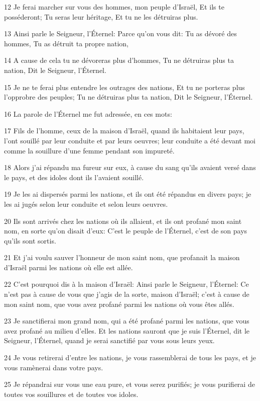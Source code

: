 \par 12 Je ferai marcher sur vous des hommes, mon peuple d'Israël, Et ils te posséderont; Tu seras leur héritage, Et tu ne les détruiras plus.
\par 13 Ainsi parle le Seigneur, l'Éternel: Parce qu'on vous dit: Tu as dévoré des hommes, Tu as détruit ta propre nation,
\par 14 A cause de cela tu ne dévoreras plus d'hommes, Tu ne détruiras plus ta nation, Dit le Seigneur, l'Éternel.
\par 15 Je ne te ferai plus entendre les outrages des nations, Et tu ne porteras plus l'opprobre des peuples; Tu ne détruiras plus ta nation, Dit le Seigneur, l'Éternel.
\par 16 La parole de l'Éternel me fut adressée, en ces mots:
\par 17 Fils de l'homme, ceux de la maison d'Israël, quand ils habitaient leur pays, l'ont souillé par leur conduite et par leurs oeuvres; leur conduite a été devant moi comme la souillure d'une femme pendant son impureté.
\par 18 Alors j'ai répandu ma fureur sur eux, à cause du sang qu'ils avaient versé dans le pays, et des idoles dont ils l'avaient souillé.
\par 19 Je les ai dispersés parmi les nations, et ils ont été répandus en divers pays; je les ai jugés selon leur conduite et selon leurs oeuvres.
\par 20 Ils sont arrivés chez les nations où ils allaient, et ils ont profané mon saint nom, en sorte qu'on disait d'eux: C'est le peuple de l'Éternel, c'est de son pays qu'ils sont sortis.
\par 21 Et j'ai voulu sauver l'honneur de mon saint nom, que profanait la maison d'Israël parmi les nations où elle est allée.
\par 22 C'est pourquoi dis à la maison d'Israël: Ainsi parle le Seigneur, l'Éternel: Ce n'est pas à cause de vous que j'agis de la sorte, maison d'Israël; c'est à cause de mon saint nom, que vous avez profané parmi les nations où vous êtes allés.
\par 23 Je sanctifierai mon grand nom, qui a été profané parmi les nations, que vous avez profané au milieu d'elles. Et les nations sauront que je suis l'Éternel, dit le Seigneur, l'Éternel, quand je serai sanctifié par vous sous leurs yeux.
\par 24 Je vous retirerai d'entre les nations, je vous rassemblerai de tous les pays, et je vous ramènerai dans votre pays.
\par 25 Je répandrai sur vous une eau pure, et vous serez purifiés; je vous purifierai de toutes vos souillures et de toutes vos idoles.
